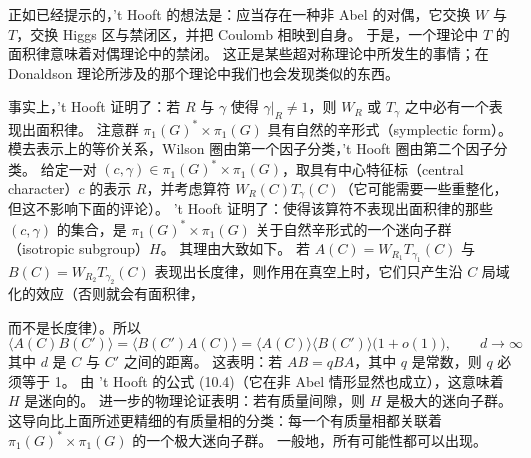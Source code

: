 正如已经提示的，'t Hooft 的想法是：应当存在一种非 Abel 的对偶，它交换 $W$ 与 $T$，交换 Higgs 区与禁闭区，并把 Coulomb 相映到自身。
于是，一个理论中 $T$ 的面积律意味着对偶理论中的禁闭。
这正是某些超对称理论中所发生的事情；在 Donaldson 理论所涉及的那个理论中我们也会发现类似的东西。

事实上，'t Hooft 证明了：若 $R$ 与 $\gamma$ 使得 $\gamma|_R\neq1$，则 $W_R$ 或 $T_\gamma$ 之中必有一个表现出面积律。
注意群 $\pi_1(G)^*\times\pi_1(G)$ 具有自然的辛形式（symplectic form）。
模去表示上的等价关系，Wilson 圈由第一个因子分类，'t Hooft 圈由第二个因子分类。
给定一对 $(c,\gamma)\in\pi_1(G)^*\times\pi_1(G)$，取具有中心特征标（central character）$c$ 的表示 $R$，并考虑算符 $W_R(C)T_\gamma(C)$（它可能需要一些重整化，但这不影响下面的评论）。
't Hooft 证明了：使得该算符不表现出面积律的那些 $(c,\gamma)$ 的集合，是 $\pi_1(G)^*\times\pi_1(G)$ 关于自然辛形式的一个迷向子群（isotropic subgroup）$H$。
其理由大致如下。
若 $A(C)=W_{R_1}T_{\gamma_1}(C)$ 与 $B(C)=W_{R_2}T_{\gamma_2}(C)$ 表现出长度律，则作用在真空上时，它们只产生沿 $C$ 局域化的效应（否则就会有面积律，


而不是长度律）。所以
\begin{equation}\tag{10.11}\label{eq:10-11}
\langle A(C)B(C')\rangle=\langle B(C')A(C)\rangle=\langle A(C)\rangle\langle B(C')\rangle\bigl(1+o(1)\bigr),\qquad d\to\infty
\end{equation}
其中 $d$ 是 $C$ 与 $C'$ 之间的距离。
这表明：若 $AB=qBA$，其中 $q$ 是常数，则 $q$ 必须等于 1。
由 't Hooft 的公式 (10.4)（它在非 Abel 情形显然也成立），这意味着 $H$ 是迷向的。
进一步的物理论证表明：若有质量间隙，则 $H$ 是极大的迷向子群。
这导向比上面所述更精细的有质量相的分类：每一个有质量相都关联着 $\pi_1(G)^*\times\pi_1(G)$ 的一个极大迷向子群。
一般地，所有可能性都可以出现。

